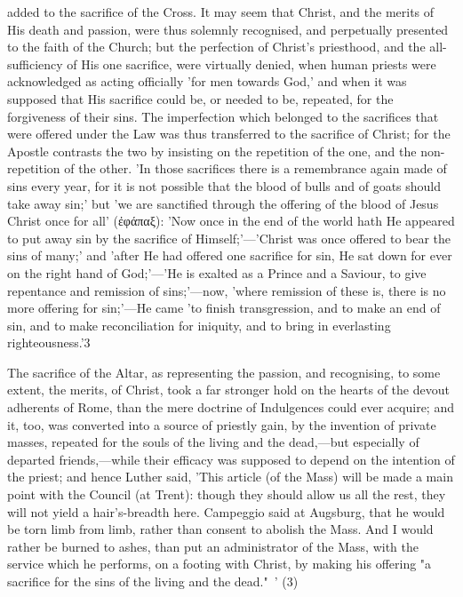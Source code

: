 \documentclass[
]{book}
\begin{document}
added to the sacrifice of the Cross. It may seem that Christ, and the merits of His death and passion, were thus solemnly recognised, and perpetually presented to the faith of the Church; but the perfection of Christ's priesthood, and the all-sufficiency of His one sacrifice, were virtually denied, when human priests were acknowledged as acting officially 'for men towards God,' and when it was supposed that His sacrifice could be, or needed to be, repeated, for the forgiveness of their sins. The imperfection which belonged to the sacrifices that were offered under the Law was thus transferred to the sacrifice of Christ; for the Apostle contrasts the two by insisting on the repetition of the one, and the non-repetition of the other. 'In those sacrifices there is a remembrance again made of sins every year, for it is not possible that the blood of bulls and of goats should take away sin;' but 'we are sanctified through the offering of the blood of Jesus Christ once for all' (ἐφάπαξ): 'Now once in the end of the world hath He appeared to put away sin by the sacrifice of Himself;'---'Christ was once offered to bear the sins of many;' and 'after He had offered one sacrifice for sin, He sat down for ever on the right hand of God;'---'He is exalted as a Prince and a Saviour, to give repentance and remission of sins;'---now, 'where remission of these is, there is no more offering for sin;'---He came 'to finish transgression, and to make an end of sin, and to make reconciliation for iniquity, and to bring in everlasting righteousness.'3

The sacrifice of the Altar, as representing the passion, and recognising, to some extent, the merits, of Christ, took a far stronger hold on the hearts of the devout adherents of Rome, than the mere doctrine of Indulgences could ever acquire; and it, too, was converted into a source of priestly gain, by the invention of private masses, repeated for the souls of the living and the dead,---but especially of departed friends,---while their efficacy was supposed to depend on the intention of the priest; and hence Luther said, 'This article (of the Mass) will be made a main point with the Council (at Trent): though they should allow us all the rest, they will not yield a hair's-breadth here. Campeggio said at Augsburg, that he would be torn limb from limb, rather than consent to abolish the Mass. And I would rather be burned to ashes, than put an administrator of the Mass, with the service which he performs, on a footing with Christ, by making his offering "a sacrifice for the sins of the living and the dead."~' (3)
\end{document}
